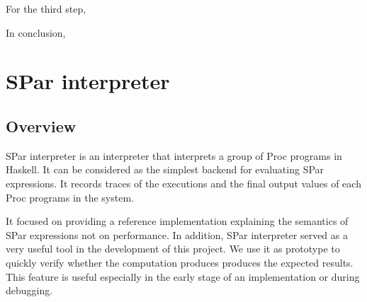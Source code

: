 For the third step, 

In conclusion, 
\section{SPar interpreter} \label{impl:sec:interp}
\subsection{Overview}
SPar interpreter is an interpreter that interprets a group of Proc programs in Haskell. It can be considered as the simplest backend for evaluating SPar expressions. It records traces of the executions and the final output values of each Proc programs in the system. 

It focused on providing a reference implementation explaining the semantics of SPar expressions not on performance. In addition, SPar interpreter served as a very useful tool in the development of this project. We use it as prototype to quickly verify whether the computation produces produces the expected results. This feature is useful especially in the early stage of an implementation or during debugging.
